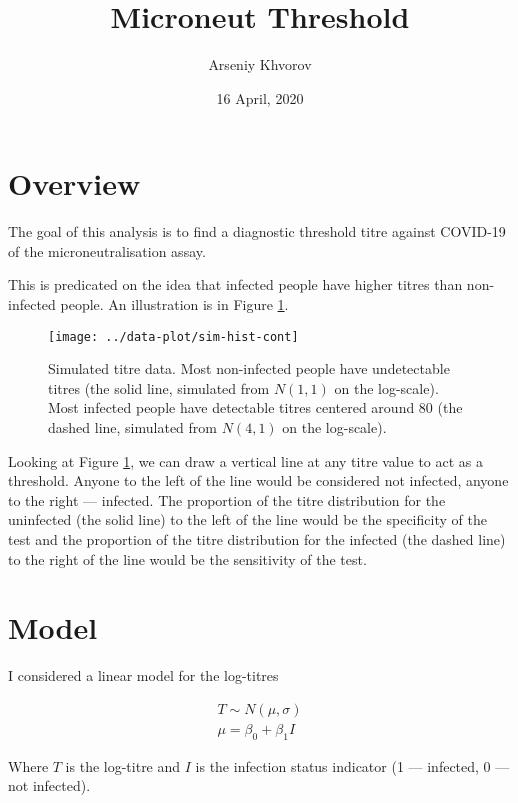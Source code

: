 \documentclass[]{article}
\title{Microneut Threshold}
\author{Arseniy Khvorov}
\date{16 April, 2020}
\begin{document}
\maketitle

\section{Overview}\label{overview}

The goal of this analysis is to find a diagnostic threshold titre
against COVID-19 of the microneutralisation assay.

This is predicated on the idea that infected people have higher titres
than non-infected people. An illustration is in Figure
\ref{fig:sim-hist-cont}.






\begin{figure}

{\centering \texttt{[image: ../data-plot/sim-hist-cont]} 

}

\caption{Simulated titre data. Most non-infected people have
undetectable titres (the solid line, simulated from \(N(1, 1)\) on the
log-scale). Most infected people have detectable titres centered around
80 (the dashed line, simulated from \(N(4, 1)\) on the log-scale).}\label{fig:sim-hist-cont}
\end{figure}

Looking at Figure \ref{fig:sim-hist-cont}, we can draw a vertical line
at any titre value to act as a threshold. Anyone to the left of the line
would be considered not infected, anyone to the right --- infected. The
proportion of the titre distribution for the uninfected (the solid line)
to the left of the line would be the specificity of the test and the
proportion of the titre distribution for the infected (the dashed line)
to the right of the line would be the sensitivity of the test.

\section{Model}\label{model}

I considered a linear model for the log-titres

\begin{gather*}
T \sim N(\mu, \sigma) \\
\mu = \beta_0 + \beta_1 I
\end{gather*}

Where \(T\) is the log-titre and \(I\) is the infection status indicator
(1 --- infected, 0 --- not infected).
\end{document}
